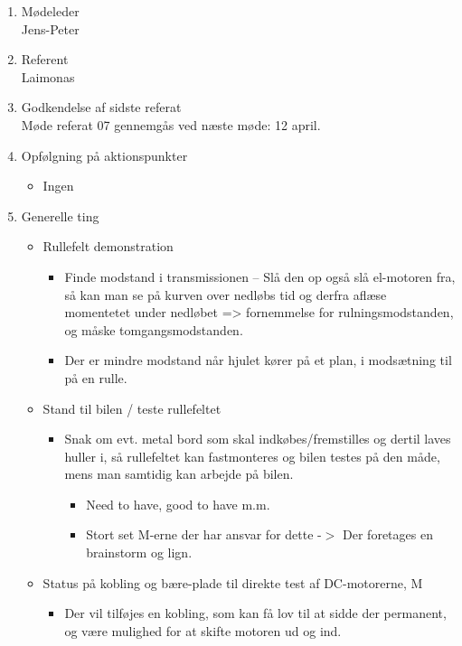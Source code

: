 	\begin{enumerate}
		\itemsep 0.3em 
		\item Mødeleder\\
			Jens-Peter
		\item Referent\\
			Laimonas
		\item Godkendelse af sidste referat\\
			Møde referat 07 gennemgås ved næste møde: 12 april. 

		\item Opfølgning på aktionspunkter
		\begin{itemize}
			\itemsep 0.3em 
			\item Ingen
		\end{itemize}
		
		\item Generelle ting
			\begin{itemize}
				\item Rullefelt demonstration
			
				\begin{itemize}
					\item Finde modstand i transmissionen – Slå den op også slå el-motoren fra, så kan man se på kurven over nedløbs tid og derfra aflæse momentetet under nedløbet => fornemmelse for  rulningsmodstanden, og måske tomgangsmodstanden. 
					\item Der er mindre modstand når hjulet kører på et plan, i modsætning  til på en rulle.
				\end{itemize}
				\item Stand til bilen / teste rullefeltet
			
				\begin{itemize}
					\item Snak om evt. metal bord som skal indk\o{}bes/fremstilles og dertil laves huller
					i, s\aa{} rullefeltet kan fastmonteres og bilen testes p\aa{} den m\aa{}de, mens
					man samtidig kan arbejde p\aa{} bilen.
					
					\begin{itemize}
						\item Need to have, good to have m.m.
						\item Stort set M-erne der har ansvar for dette -$>$ Der foretages en brainstorm og lign.
					\end{itemize}
				\end{itemize}
			\end{itemize}
			
			\begin{itemize}
				\item Status på kobling og bære-plade til direkte test af DC-motorerne, M
					\begin{itemize}
						\item Der vil tilføjes en kobling, som kan få lov til at sidde der permanent, og være mulighed for at skifte motoren ud og ind.
					\end{itemize}
			\end{itemize}
				

\end{enumerate}
